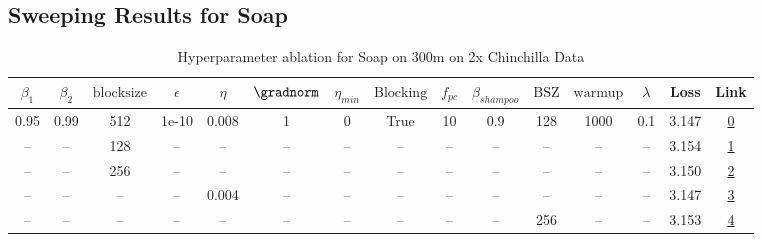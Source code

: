\subsection{Sweeping Results for Soap}%
\begin{table}[H]
\centering
\caption{Hyperparameter ablation for Soap on 300m on 2x Chinchilla Data}
\label{tab:ablation_soap_300m_on_2x_chinchilla_data}
\begin{tabular}{ccccccccccccccc}
\toprule
$\beta_1$ & $\beta_2$ & $\mathrm{block size}$ & $\epsilon$ & $\eta$ & $\gradnorm$ & $\eta_{min}$ & $\mathrm{Blocking}$ & $f_{pc}$ & $\beta_{shampoo}$ & $\mathrm{BSZ}$ & $\mathrm{warmup}$ & $\lambda$ & Loss & Link \\
\midrule
0.95 & 0.99 & 512 & 1e-10 & 0.008 & 1 & 0 & True & 10 & 0.9 & 128 & 1000 & 0.1 & 3.147 & \href{https://wandb.ai/stanford-mercury/optimizer-scaling/runs/sweep-300m-12B-soapefe4b166lr0.008-wd0.1-minlr0-warmup1000-b10.9-cebb81}{0} \\
\midrule
-- & -- & 128 & -- & -- & -- & -- & -- & -- & -- & -- & -- & -- & 3.154 & \href{https://wandb.ai/stanford-mercury/optimizer-scaling/runs/sweep-300m-12B-soapeb93333lr0.008-wd0.1-minlr0-warmup1000-b10.95-feb227}{1} \\
-- & -- & 256 & -- & -- & -- & -- & -- & -- & -- & -- & -- & -- & 3.150 & \href{https://wandb.ai/stanford-mercury/optimizer-scaling/runs/sweep-300m-12B-soape1f2d4flr0.008-wd0.1-minlr0-warmup1000-b10.95-78cbf5}{2} \\
-- & -- & -- & -- & 0.004 & -- & -- & -- & -- & -- & -- & -- & -- & 3.147 & \href{https://wandb.ai/stanford-mercury/optimizer-scaling/runs/sweep-300m-12B-soapef97cdfclr0.004-wd0.1-minlr0-warmup1000-b10.9-dec1d6}{3} \\
-- & -- & -- & -- & -- & -- & -- & -- & -- & -- & 256 & -- & -- & 3.153 & \href{https://wandb.ai/stanford-mercury/optimizer-scaling/runs/sweep-300m-12B-soape63ad3blr0.008-wd0.1-minlr0-warmup1000-b10.95-b1cbe1}{4} \\
\bottomrule
\end{tabular}
\end{table}

